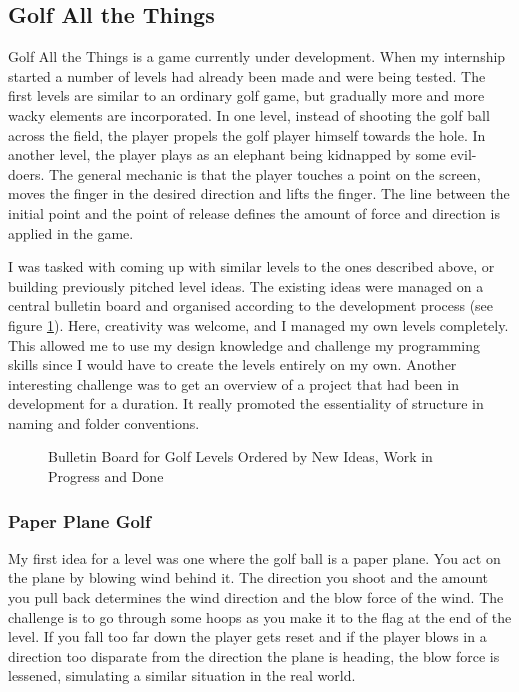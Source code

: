 \subsection{Golf All the Things}
Golf All the Things is a game currently under development. When my internship started a number of levels had already been made and were being tested. The first levels are similar to an ordinary golf game, but gradually more and more wacky elements are incorporated. In one level, instead of shooting the golf ball across the field, the player propels the golf player himself towards the hole. In another level, the player plays as an elephant being kidnapped by some evil-doers. The general mechanic is that the player touches a point on the screen, moves the finger in the desired direction and lifts the finger. The line between the initial point and the point of release defines the amount of force and direction is applied in the game.

I was tasked with coming up with similar levels to the ones described above, or building previously pitched level ideas. The existing ideas were managed on a central bulletin board and organised according to the development process (see figure \ref{Bulletin}). Here, creativity was welcome, and I managed my own levels completely. This allowed me to use my design knowledge and challenge my programming skills since I would have to create the levels entirely on my own. Another interesting challenge was to get an overview of a project that had been in development for a duration. It really promoted the essentiality of structure in naming and folder conventions.
\begin{center}
  \begin{figure}[!htb]
    \noindent{}
    \caption{Bulletin Board for Golf Levels Ordered by New Ideas, Work in Progress and Done}
    \label{Bulletin}
  \end{figure}
\end{center}
\subsubsection{Paper Plane Golf}
My first idea for a level was one where the golf ball is a paper plane. You act on the plane by blowing wind behind it. The direction you shoot and the amount you pull back determines the wind direction and the blow force of the wind. The challenge is to go through some hoops as you make it to the flag at the end of the level. If you fall too far down the player gets reset and if the player blows in a direction too disparate from the direction the plane is heading, the blow force is lessened, simulating a similar situation in the real world.

